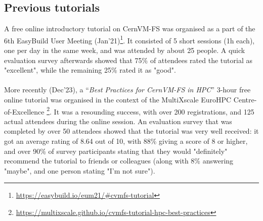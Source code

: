 \subsection*{Previous tutorials}

A free online introductory tutorial on CernVM-FS was organised as a part of the 6th EasyBuild User Meeting
(Jan'21)\footnote{\href{https://easybuild.io/eum21/\#cvmfs-tutorial}{https://easybuild.io/eum21/\#cvmfs-tutorial}}.
It consisted of 5 short sessions (1h each), one per day in the same week, and was attended by about 25 people.
A quick evaluation survey afterwards showed that 75\% of attendees rated the tutorial as "excellent", while the remaining 25\%
rated it as "good".

\paragraph{}
More recently (Dec'23), a ``\emph{Best Practices for CernVM-FS in HPC}'' 3-hour free online tutorial
was organised in the context of the MultiXscale EuroHPC Centre-of-Excellence
\footnote{\href{https://multixscale.github.io/cvmfs-tutorial-hpc-best-practices}{https://multixscale.github.io/cvmfs-tutorial-hpc-best-practices}}.
It was a resounding success, with over 200 registrations, and 125 actual attendees during the online session.
An evaluation survey that was completed by over 50 attendees showed that the tutorial was very well received:
it got an average rating of 8.64 out of 10, with 88\% giving a score of 8 or higher, and over 90\% of survey
participants stating that they would "definitely" recommend the tutorial to friends or colleagues (along with 8\%
answering "maybe", and one person stating "I'm not sure").
